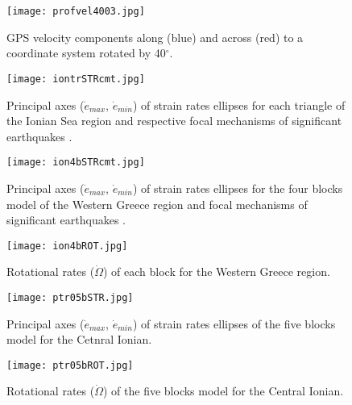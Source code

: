 \begin{extsum}
\begin{figure}[H]
  \begin{center}
    \texttt{[image: profvel4003.jpg]}
    \caption{GPS velocity components along (blue) and across (red) to a coordinate system rotated by 40$^{\circ}$. }
    \label{fig_e:profvel40}
  \end{center}
\end{figure}

\begin{figure}[H]
  \begin{center}
    \texttt{[image: iontrSTRcmt.jpg]}
    \caption{Principal axes ($\dot{e}_{max}$, $\dot{e}_{min}$) of strain rates ellipses for each triangle of the Ionian Sea region and respective focal mechanisms of significant earthquakes \citep{harvcmt02,Papazachos1997}.}
    \label{fig_e:iontrSTRcmt}
  \end{center}
\end{figure}

\begin{figure}[H]
  \begin{center}
    \texttt{[image: ion4bSTRcmt.jpg]}
    \caption{Principal axes ($\dot{e}_{max}$, $\dot{e}_{min}$) of strain rates ellipses for the four blocks model of the Western Greece region and focal mechanisms of significant earthquakes \citep{harvcmt02,Papazachos1997}.}
    \label{fig_e:ion4bSTRcmt}
  \end{center}
\end{figure}

\begin{figure}[H]
  \begin{center}
    \texttt{[image: ion4bROT.jpg]}
    \caption{Rotational rates ($\dot{\Omega}$) of each block for the Western Greece region.}
    \label{fig_e:ion4bROT}
  \end{center}
\end{figure}

\begin{figure}[H]
  \begin{center}
    \texttt{[image: ptr05bSTR.jpg]}
    \caption{Principal axes ($\dot{e}_{max}$, $\dot{e}_{min}$) of strain rates ellipses  of the five blocks model for the Cetnral Ionian.}
    \label{fig_e:ptr05bSTR}
  \end{center}
\end{figure}

\begin{figure}[H]
  \begin{center}
    \texttt{[image: ptr05bROT.jpg]}
    \caption{Rotational rates ($\dot{\Omega}$) of the five blocks model for the Central Ionian.}
    \label{fig_e:ptr05bROT}
  \end{center}
\end{figure}


\end{extsum}
